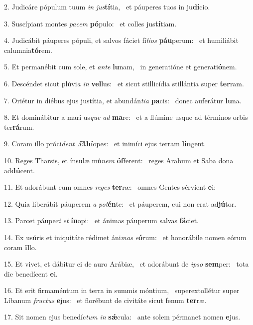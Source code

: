 2. Judicáre pópulum tuum \textit{in} \textit{jus}\textbf{tí}tia, \ast\  et páuperes tuos in ju\textbf{dí}cio.\

3. Suscípiant montes \textit{pa}\textit{cem} \textbf{pó}pulo: \ast\  et colles jus\textbf{tí}tiam.\

4. Judicábit páuperes pópuli, et salvos fáciet fí\textit{li}\textit{os} \textbf{páu}perum: \ast\  et humiliábit calumnia\textbf{tó}rem.\

5. Et permanébit cum sole, et \textit{an}\textit{te} \textbf{lu}nam, \ast\  in generatióne et generati\textbf{ó}nem.\

6. Descéndet sicut plúvi\textit{a} \textit{in} \textbf{vel}lus: \ast\  et sicut stillicídia stillántia super \textbf{ter}ram.\

7. Oriétur in diébus ejus justítia, et abundán\textit{ti}\textit{a} \textbf{pa}cis: \ast\  donec auferátur \textbf{lu}na.\

8. Et dominábitur a mari us\textit{que} \textit{ad} \textbf{ma}re: \ast\  et a flúmine usque ad términos orbis ter\textbf{rá}rum.\

9. Coram illo próci\textit{dent} \textit{Æ}\textbf{thí}opes: \ast\  et inimíci ejus terram \textbf{lin}gent.\

10. Reges Tharsis, et ínsulæ mú\textit{ne}\textit{ra} \textbf{óf}ferent: \ast\  reges Arabum et Saba dona ad\textbf{dú}cent.\

11. Et adorábunt eum omnes \textit{re}\textit{ges} \textbf{ter}ræ: \ast\  omnes Gentes sérvient \textbf{e}i:\

12. Quia liberábit páuperem \textit{a} \textit{pot}\textbf{én}te: \ast\  et páuperem, cui non erat ad\textbf{jú}tor.\

13. Parcet páupe\textit{ri} \textit{et} \textbf{ín}opi: \ast\  et ánimas páuperum salvas \textbf{fá}ciet.\

14. Ex usúris et iniquitáte rédimet áni\textit{mas} \textit{e}\textbf{ó}rum: \ast\  et honorábile nomen eórum coram \textbf{il}lo.\

15. Et vivet, et dábitur ei de auro Arábiæ, \dag\  et adorábunt de \textit{ip}\textit{so} \textbf{sem}per: \ast\  tota die benedícent \textbf{e}i.\

16. Et erit firmaméntum in terra in summis móntium, \dag\  superextollétur super Líbanum \textit{fruc}\textit{tus} \textbf{e}jus: \ast\  et florébunt de civitáte sicut fenum \textbf{ter}ræ.\

17. Sit nomen ejus benedíc\textit{tum} \textit{in} \textbf{sǽ}cula: \ast\  ante solem pérmanet nomen \textbf{e}jus.\

